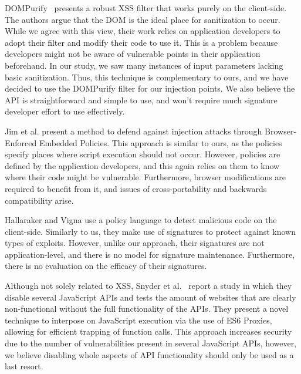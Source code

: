 DOMPurify~\cite{10.1007/978-3-319-66399-9_7} presents a robust \ac{XSS} filter that works purely on the client-side. The authors argue that the DOM is the ideal place for sanitization to occur. While we agree with this view, their work relies on application developers to adopt their filter and modify their code to use it. This is a problem because developers might not be aware of vulnerable points in their application beforehand. In our study, we saw many instances of input parameters lacking basic sanitization. Thus, this technique is complementary to ours, and we have decided to use the DOMPurify filter for our injection points. We also believe the API is straightforward and simple to use, and won't require much signature developer effort to use effectively.

Jim et al. \cite{Jim:2007:DSI:1242572.1242654} present a method to defend against injection attacks through Browser-Enforced Embedded Policies. This approach is similar to ours, as the policies specify places where script execution should not occur. However, policies are defined by the application developers, and this again relies on them to know where their code might be vulnerable. Furthermore, browser modifications are required to benefit from it, and issues of cross-portability and backwards compatibility arise.

Hallaraker and Vigna \cite{Hallaraker:2005:DMJ:1078029.1078861} use a policy language to detect malicious code on the client-side. Similarly to us, they make use of signatures to protect against known types of exploits. However, unlike our approach, their signatures are not application-level, and there is no model for signature maintenance. Furthermore, there is no evaluation on the efficacy of their signatures. 

Although not solely related to \ac{XSS}, Snyder et al.~\cite{Snyder:2017:MWD:3133956.3133966} report a study in which they disable several JavaScript APIs and tests the amount of websites that are clearly non-functional without the full functionality of the APIs. They present a novel technique to interpose on JavaScript execution via the use of ES6 Proxies, allowing for efficient trapping of function calls. This approach increases security due to the number of vulnerabilities present in several JavaScript APIs, however, we believe disabling whole aspects of API functionality should only be used as a last resort.

